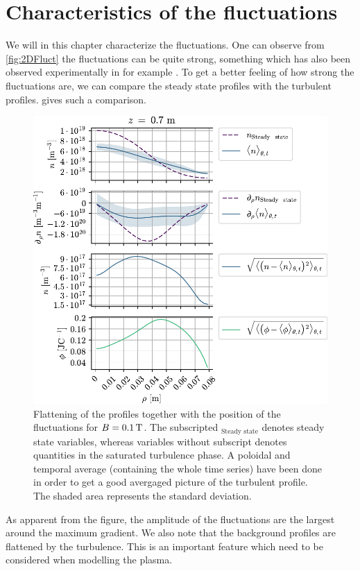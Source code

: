 \section{Characteristics of the fluctuations}
%
We will in this chapter characterize the fluctuations.
One can observe from \cref{fig:2DFluct} the fluctuations can be quite strong, something which has also been observed experimentally in for example \cite{Burin2005}.
To get a better feeling of how strong the fluctuations are, we can compare the steady state profiles with the turbulent profiles.
 gives such a comparison.
%
\begin{figure}[h!]
    \begin{center}
        \includegraphics{fig/results/posOfFluct/posOfFluctB01}
    \end{center}
    \caption{Flattening of the profiles together with the position of the fluctuations for $B=0.1\, \text{T}$.
        The subscripted $_\text{Steady state}$ denotes steady state variables, whereas variables without subscript denotes quantities in the saturated turbulence phase.
        A poloidal and temporal average (containing the whole time series) have been done in order to get a good avergaged picture of the turbulent profile.
        The shaded area represents the standard deviation.
    }
    \label{fig:posOfFluct01}
\end{figure}
%
As apparent from the figure, the amplitude of the fluctuations are the largest around the maximum gradient.
We also note that the background profiles are flattened by the turbulence.
This is an important feature which need to be considered when modelling the plasma.

